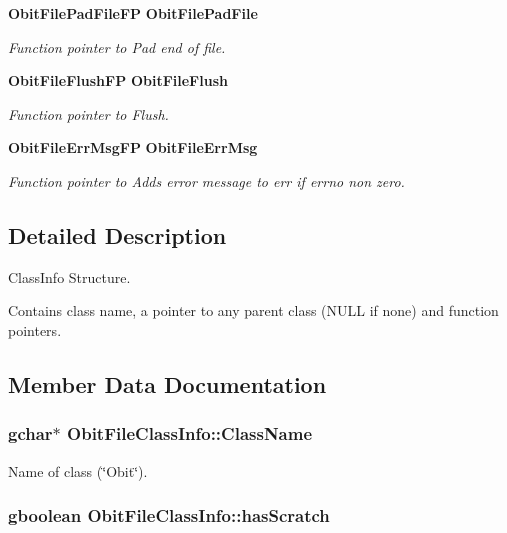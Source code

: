 \begin{CompactItemize}
{\bf Obit\-File\-Pad\-File\-FP} {\bf Obit\-File\-Pad\-File}
\begin{CompactList}\small\item\em Function pointer to Pad end of file. \item\end{CompactList}\item 
{\bf Obit\-File\-Flush\-FP} {\bf Obit\-File\-Flush}
\begin{CompactList}\small\item\em Function pointer to Flush. \item\end{CompactList}\item 
{\bf Obit\-File\-Err\-Msg\-FP} {\bf Obit\-File\-Err\-Msg}
\begin{CompactList}\small\item\em Function pointer to Adds error message to err if errno non zero. \item\end{CompactList}\end{CompactItemize}


\subsection{Detailed Description}
Class\-Info Structure. 

Contains class name, a pointer to any parent class (NULL if none) and function pointers. 



\subsection{Member Data Documentation}
\subsubsection{\setlength{\rightskip}{0pt plus 5cm}gchar$\ast$ {\bf Obit\-File\-Class\-Info::Class\-Name}}\label{structObitFileClassInfo_o2}


Name of class (\char`\"{}Obit\char`\"{}). 

\subsubsection{\setlength{\rightskip}{0pt plus 5cm}gboolean {\bf Obit\-File\-Class\-Info::has\-Scratch}}\label{structObitFileClassInfo_o1}


